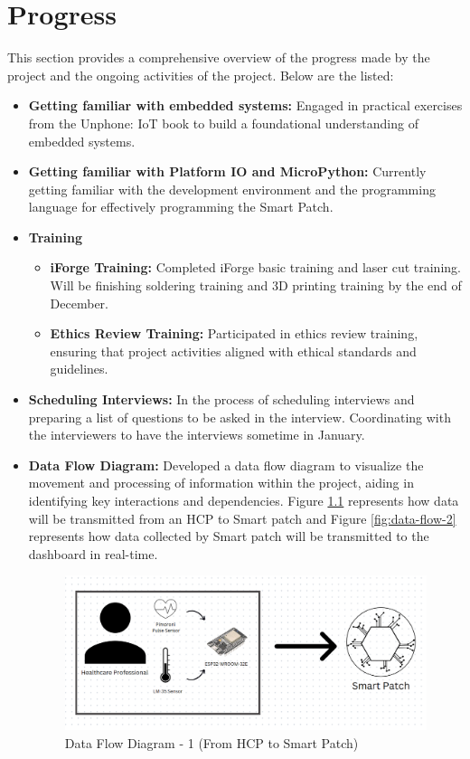 \newpage

\chapter{Progress}

This section provides a comprehensive overview of the progress made by the project and the ongoing activities of the project. Below are the listed:

\begin{itemize}
    \item \textbf{Getting familiar with embedded systems:} Engaged in practical exercises from the Unphone: IoT book to build a foundational understanding of embedded systems. 
    \item \textbf{Getting familiar with Platform IO and MicroPython:} Currently getting familiar with the development environment and the programming language for effectively programming the Smart Patch.
    \item \textbf{Training}
    \begin{itemize}
        \item \textbf{iForge Training:} Completed iForge basic training and laser cut training. Will be finishing soldering training and 3D printing training by the end of December. 
        \item \textbf{Ethics Review Training:} Participated in ethics review training, ensuring that project activities aligned with ethical standards and guidelines.
    \end{itemize}
    \item \textbf{Scheduling Interviews:} In the process of scheduling interviews and preparing a list of questions to be asked in the interview. Coordinating with the interviewers to have the interviews sometime in January. 
    \item \textbf{Data Flow Diagram:} Developed a data flow diagram to visualize the movement and processing of information within the project, aiding in identifying key interactions and dependencies. Figure \ref{fig:data-flow-1} represents how data will be transmitted from an HCP to Smart patch and Figure \ref{fig:data-flow-2} represents how data collected by Smart patch will be transmitted to the dashboard in real-time. 
    
\begin{figure}
    \centering
    \includegraphics[width=\linewidth]{images/data-flow-1.png}
    \caption{Data Flow Diagram - 1 (From HCP to Smart Patch)}
    \label{fig:data-flow-1}
\end{figure}


\end{itemize}
